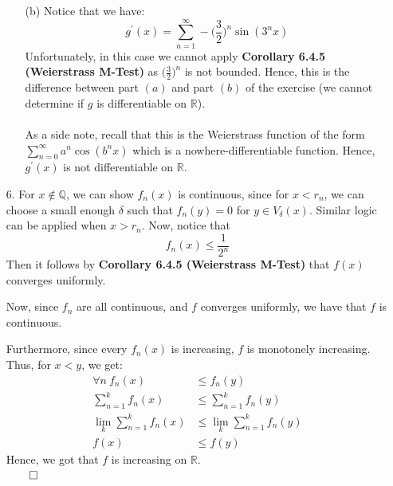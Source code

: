 \documentclass[11pt]{article}
\newcommand{\reals}{\mathbb{R}}
\begin{document}
\begin{itemize}
\begin{itemize}
            \item[(b)]
                Notice that we have:
                \begin{equation*}
                    g^\prime(x) =
                        \sum_{n = 1}^\infty
                            -\Big(\frac{3}{2}\Big)^n\sin{(3^nx)}
                \end{equation*}
                Unfortunately, in this case we cannot apply \textbf{Corollary
                6.4.5 (Weierstrass M-Test)} as $\Big(\frac{3}{2}\Big)^n$ is not
                bounded. Hence, this is the difference between part $(a)$ and
                part $(b)$ of the exercise (we cannot determine if $g$ is
                differentiable on $\reals$).
                \\
                \\
                As a side note, recall that this is the Weierstrass function of
                the form $\sum_{n = 0}^\infty a^n\cos{(b^nx)}$ which is a
                nowhere-differentiable function. Hence, $g^\prime(x)$ is not
                differentiable on $\reals$.
        \end{itemize}

    \item[6.]
        For $x \not\in \mathbb{Q}$, we can show $f_n(x)$ is continuous, since
        for $x < r_n$, we can choose a small enough $\delta$ such that $f_n(y)
        = 0$ for $y \in V_\delta(x)$. Similar logic can be applied when $x >
        r_n$. Now, notice that
        \begin{equation*}
            f_n(x) \leq \frac{1}{2^n}
        \end{equation*}
        Then it follows by \textbf{Corollary 6.4.5 (Weierstrass M-Test)} that
        $f(x)$ converges uniformly.

        Now, since $f_n$ are all continuous, and $f$ converges uniformly, we
        have that $f$ is continuous.

        Furthermore, since every $f_n(x)$ is increasing, $f$ is monotonely
        increasing. Thus, for $x < y$, we get:
        \begin{align*}
          \forall n\ f_n(x) &\leq f_n(y)\\
          \sum_{n = 1}^k f_n(x) &\leq \sum_{n = 1}^k f_n(y)\\
          \lim_k \sum_{n = 1}^k f_n(x) &\leq \lim_k \sum_{n = 1}^k f_n(y)\\
          f(x) &\leq f(y)
        \end{align*}
        Hence, we got that $f$ is increasing on $\reals$.\\
        $\qed$


\end{itemize}
\end{document}
